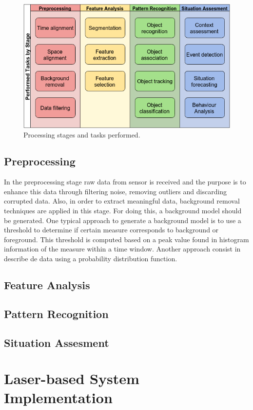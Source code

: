 \documentclass[10pt,twocolumn,letterpaper]{article}
\begin{document}
\begin{figure}[ht!]
\centering
\includegraphics[scale=0.35]{../fig/3/processing_stages_and_tasks.png}
\caption{Processing stages and tasks performed.}
\label{proc_stages_tasks}
\end{figure}
\subsection{Preprocessing}
 In the preprocessing stage raw data from sensor is received and the purpose is to enhance this data through filtering noise, removing outliers and discarding corrupted data. Also, in order to extract meaningful data, background removal techniques are applied in this stage. For doing this, a background model should be generated. One typical approach to generate a background model is to use a threshold to determine if certain measure corresponds to background or foreground. This threshold is computed based on a peak value found in histogram information of the measure within a time window. Another approach consist in describe de data using a probability distribution function.
\subsection{Feature Analysis}
\subsection{Pattern Recognition}
\subsection{Situation Assesment}

\section{Laser-based System Implementation}
\end{document}
